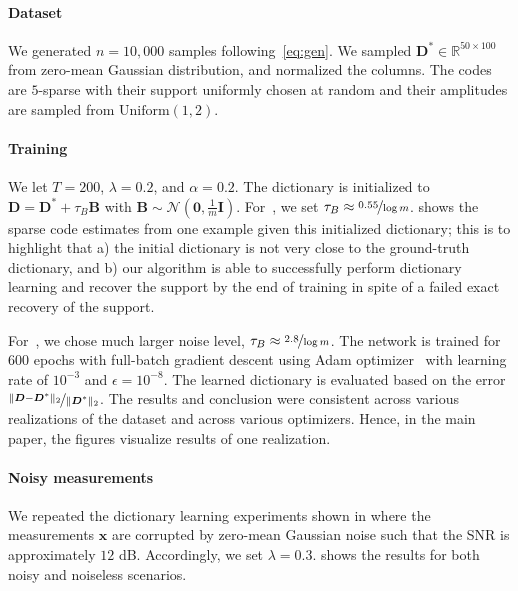 \documentclass[10pt]{article} %
\newcommand{\R}{\mathbb{R}} %
\newcommand{\D}{{\bm D}}
\newcommand{\eye}{{\bm I}}
\newcommand{\x}{{\bm x}}
\newcommand{\zero}{{\bm 0}}
\begin{document}
\paragraph{Dataset} We generated $n\!=\!10{,}000$ samples following~\eqref{eq:gen}. We sampled $\D^{\ast}\!\in\!\R^{50 \times 100}$ from zero-mean Gaussian distribution, and normalized the columns. The codes are $5$-sparse with their support uniformly chosen at random and their amplitudes are sampled from $\text{Uniform}(1,2)$.
%
\paragraph{Training} We let $T=200$, $\lambda = 0.2$, and $\alpha = 0.2$. The dictionary is initialized to $\D = \D^{\ast} + \tau_B {\bm B}$ with ${\bm B} \sim \mathcal{N}(\zero, \frac{1}{m} \eye)$. For~, we set $\tau_B \approx \nicefrac{0.55}{\log m}$.  shows the sparse code estimates from one example given this initialized dictionary; this is to highlight that a) the initial dictionary is not very close to the ground-truth dictionary, and b) our algorithm is able to successfully perform dictionary learning and recover the support by the end of training in spite of a failed exact recovery of the support.

For~, we chose much larger noise level, $\tau_B \approx \nicefrac{2.8}{\log m}$. The network is trained for $600$ epochs with full-batch gradient descent using Adam optimizer~\citep{kingma2014adam} with learning rate of $10^{-3}$ and $\epsilon = 10^{-8}$. The learned dictionary is evaluated based on the error $\nicefrac{\| \D - \D^{\ast} \|_2}{\| \D^{\ast} \|_2}$. The results and conclusion were consistent across various realizations of the dataset and across various optimizers. Hence, in the main paper, the figures visualize results of one realization.
%
\paragraph{Noisy measurements} We repeated the dictionary learning experiments shown in  where the measurements $\x$ are corrupted by zero-mean Gaussian noise such that the SNR is approximately $12$ dB. Accordingly, we set $\lambda = 0.3$.  shows the results for both noisy and noiseless scenarios.
\end{document}
